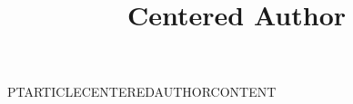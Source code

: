 \documentclass[nominted]{pt-article}
\title{Centered Author}
\begin{document}
\noindent PTARTICLECENTEREDAUTHORCONTENT
\end{document}
